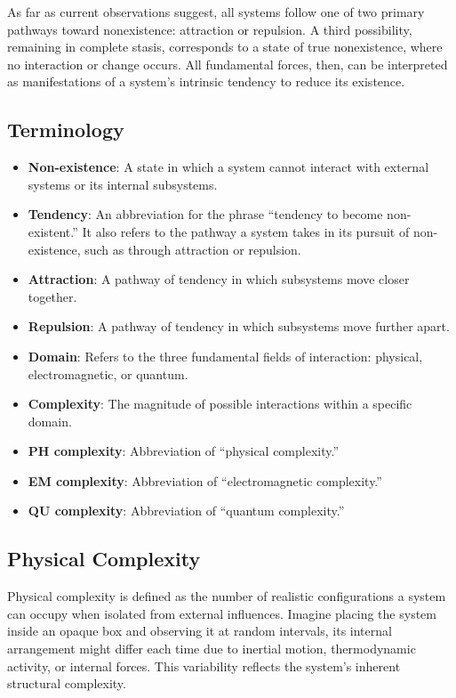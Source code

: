\documentclass{article}
\begin{document}
As far as current observations suggest, all systems follow one of two primary pathways toward nonexistence: attraction or repulsion. A third possibility, remaining in complete stasis, corresponds to a state of true nonexistence, where no interaction or change occurs. All fundamental forces, then, can be interpreted as manifestations of a system's intrinsic tendency to reduce its existence.

\subsection{Terminology}
\begin{itemize}
    \item \textbf{Non-existence}: A state in which a system cannot interact with external systems or its internal subsystems.
    \item \textbf{Tendency}: An abbreviation for the phrase “tendency to become non-existent.” It also refers to the pathway a system takes in its pursuit of non-existence, such as through attraction or repulsion.
    \item \textbf{Attraction}: A pathway of tendency in which subsystems move closer together.
    \item \textbf{Repulsion}: A pathway of tendency in which subsystems move further apart.
    \item \textbf{Domain}: Refers to the three fundamental fields of interaction: physical, electromagnetic, or quantum.
    \item \textbf{Complexity}: The magnitude of possible interactions within a specific domain.
    \item \textbf{PH complexity}: Abbreviation of “physical complexity.”
    \item \textbf{EM complexity}: Abbreviation of “electromagnetic complexity.”
    \item \textbf{QU complexity}: Abbreviation of “quantum complexity.”
\end{itemize}

\subsection{Physical Complexity}
Physical complexity is defined as the number of realistic configurations a system can occupy when isolated from external influences. Imagine placing the system inside an opaque box and observing it at random intervals, its internal arrangement might differ each time due to inertial motion, thermodynamic activity, or internal forces. This variability reflects the system’s inherent structural complexity.
\end{document}

